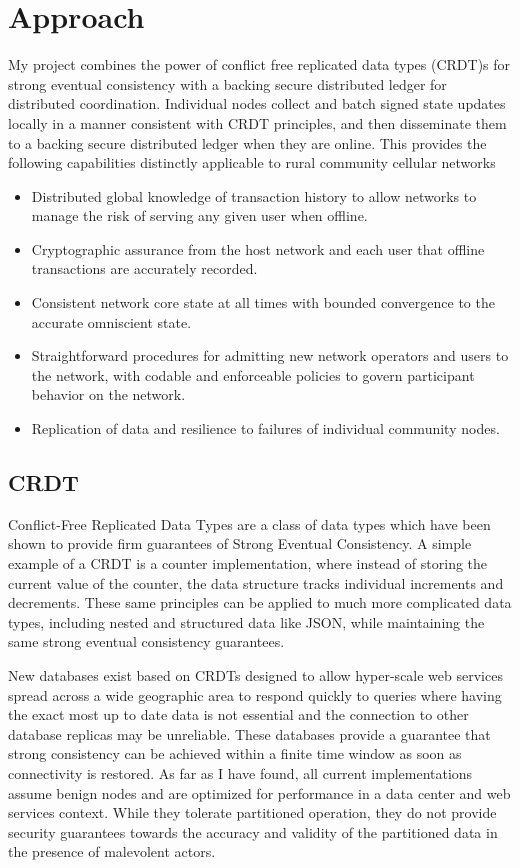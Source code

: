 \section{Approach}

My project combines the power of conflict free replicated data types
(CRDT)s for strong eventual consistency with a backing secure
distributed ledger for distributed coordination. Individual nodes
collect and batch signed state updates locally in a manner consistent
with CRDT principles, and then disseminate them to a backing secure
distributed ledger when they are online. This provides the following
capabilities distinctly applicable to rural community cellular networks

\begin{itemize}
\item Distributed global knowledge of transaction history to allow
  networks to manage the risk of serving any given user when offline.
\item Cryptographic assurance from the host network and each user that
  offline transactions are accurately recorded.
\item Consistent network core state at all times with bounded
  convergence to the accurate omniscient state.
\item Straightforward procedures for admitting new network operators
  and users to the network, with codable and enforceable policies to
  govern participant behavior on the network.
\item Replication of data and resilience to failures of individual
  community nodes.
\end{itemize}

\subsection{CRDT}
Conflict-Free Replicated Data Types are a class of data types which
have been shown to provide firm guarantees of Strong Eventual
Consistency.\cite{ShapiroConflictfreereplicateddata2011} A simple
example of a CRDT is a counter implementation, where instead of
storing the current value of the counter, the data structure tracks
individual increments and decrements. These same principles can be
applied to much more complicated data types, including nested and
structured data like JSON, while maintaining the same strong eventual
consistency guarantees.\cite{KleppmannConflictFreeReplicatedJSON2017}

New databases exist based on CRDTs designed to allow hyper-scale web
services spread across a wide geographic area to respond quickly to
queries where having the exact most up to date data is not essential
and the connection to other database replicas may be
unreliable.\cite{DatanetNewCRDT16} These databases provide a guarantee
that strong consistency can be achieved within a finite time window as
soon as connectivity is restored. As far as I have found, all current
implementations assume benign nodes and are optimized for performance
in a data center and web services context. While they tolerate
partitioned operation, they do not provide security guarantees towards
the accuracy and validity of the partitioned data in the presence of
malevolent actors.

